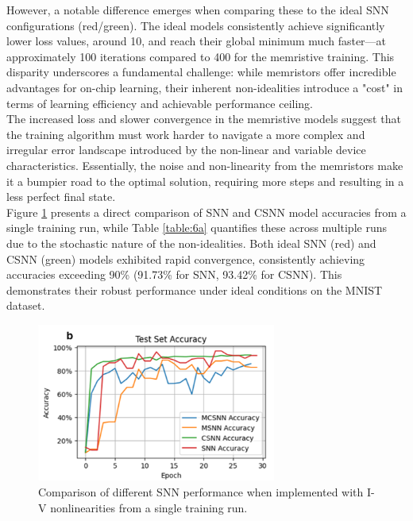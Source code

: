 \noindent However, a notable difference emerges when comparing these to the ideal SNN configurations (red/green). The ideal models consistently achieve significantly lower loss values, around 10, and reach their global minimum much faster—at approximately 100 iterations compared to 400 for the memristive training. This disparity underscores a fundamental challenge: while memristors offer incredible advantages for on-chip learning, their inherent non-idealities introduce a "cost" in terms of learning efficiency and achievable performance ceiling. \\

\noindent The increased loss and slower convergence in the memristive models suggest that the training algorithm must work harder to navigate a more complex and irregular error landscape introduced by the non-linear and variable device characteristics. Essentially, the noise and non-linearity from the memristors make it a bumpier road to the optimal solution, requiring more steps and resulting in a less perfect final state.\\

\noindent Figure \ref{fig:6k} presents a direct comparison of SNN and CSNN model accuracies from a single training run, while Table \ref{table:6a} quantifies these across multiple runs due to the stochastic nature of the non-idealities. Both ideal SNN (red) and CSNN (green) models exhibited rapid convergence, consistently achieving accuracies exceeding 90\% (91.73\% for SNN, 93.42\% for CSNN). This demonstrates their robust performance under ideal conditions on the MNIST dataset.\\

\begin{figure}[htbp!] 
    \centering    
    \includegraphics[width=0.7\textwidth]{Chapter6/Figs/k.png}
    \caption[Comparison of different SNN performance when implemented with I-V nonlinearities from a single training run.]{Comparison of different SNN performance when implemented with I-V nonlinearities from a single training run.}
    \label{fig:6k}
\end{figure}

